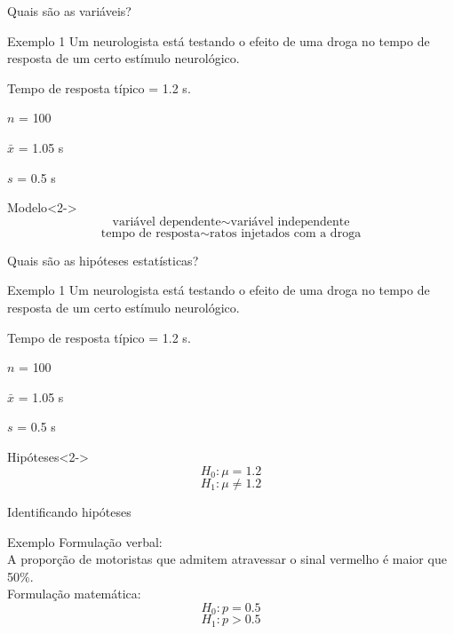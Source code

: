 \documentclass{beamer}
\begin{document}
\begin{frame}{{\footnotesize Quais são as variáveis?}}
  \begin{exampleblock}{Exemplo 1}
    \scriptsize
    Um neurologista está testando o efeito de uma droga no tempo de
    resposta de um certo estímulo neurológico.

    \smallskip
    Tempo de resposta típico = \alert{1.2 s}.

    \smallskip
    $n$ = \alert{100}

    $\bar{x}$ = \alert{1.05 s}

    $s$ = \alert{0.5 s}
  \end{exampleblock}
  \begin{block}{Modelo}<2->
    \begin{displaymath}
      \text{variável dependente} \sim \text{variável independente}
    \end{displaymath}
    \begin{displaymath}
      \text{tempo de resposta} \sim \text{ratos injetados com a droga}
    \end{displaymath}
  \end{block}
\end{frame}

\begin{frame}{{\footnotesize Quais são as hipóteses estatísticas?}}
  \begin{exampleblock}{Exemplo 1}
    \scriptsize
    Um neurologista está testando o efeito de uma droga no tempo de
    resposta de um certo estímulo neurológico.

    \smallskip
    Tempo de resposta típico = \alert{1.2 s}.

    \smallskip
    $n$ = \alert{100}

    $\bar{x}$ = \alert{1.05 s}

    $s$ = \alert{0.5 s}
  \end{exampleblock}
  \begin{exampleblock}{Hipóteses}<2->
    \begin{displaymath}
      H_0: \mu=1.2
    \end{displaymath}
    \begin{displaymath}
      H_1: \mu \ne 1.2
    \end{displaymath}
  \end{exampleblock}
\end{frame}

\begin{frame}{Identificando hipóteses}
  \begin{exampleblock}{Exemplo}
    Formulação verbal:\\
    A proporção de motoristas que admitem atravessar o sinal vermelho
    é maior que 50\%.\\
    \bigskip
    Formulação matemática:\\
    \begin{displaymath}
      H_0: p=0.5
    \end{displaymath}
    \begin{displaymath}
      H_1: p>0.5
    \end{displaymath}
  \end{exampleblock}
\end{frame}
\end{document}
